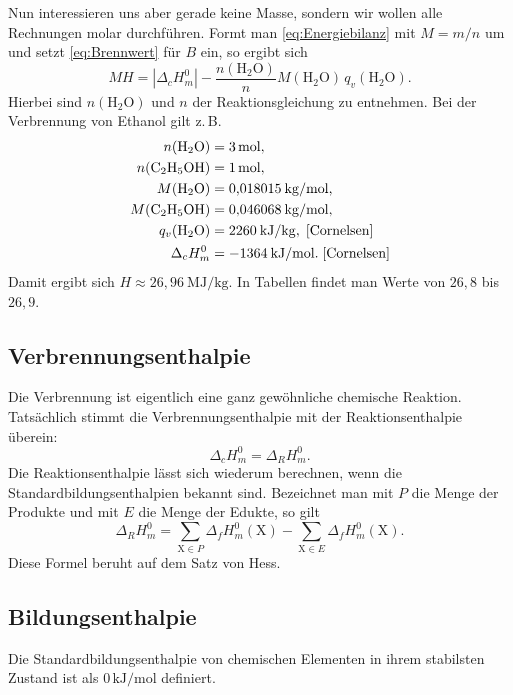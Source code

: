 \documentclass[a4paper,11pt,fleqn,twocolumn]{article}
\newcommand{\unit}[1]{\mathrm{#1}}
\begin{document}
Nun interessieren uns aber gerade keine Masse, sondern wir wollen
alle Rechnungen molar durchführen. Formt man
\eqref{eq:Energiebilanz} mit $M=m/n$ um und setzt \eqref{eq:Brennwert}
für $B$ ein, so ergibt sich
\begin{equation}
MH = |\Delta_c H_m^0| - \frac{n(\mathrm{H_2O})}{n}
M(\mathrm{H_2O})\,q_v(\mathrm{H_2O}).
\end{equation}
Hierbei sind $n(\mathrm{H_2O})$ und $n$ der Reaktionsgleichung
zu entnehmen.
Bei der Verbrennung von Ethanol gilt z.\,B.
\[\begin{split}
n(\mathrm{H_2O}) &= 3\,\unit{mol},\\
n(\mathrm{C_2H_5OH}) &= 1\,\unit{mol},\\
M(\mathrm{H_2O}) &= 0{,}018015\:\unit{kg/mol},\\
M(\mathrm{C_2H_5OH}) &= 0{,}046068\:\unit{kg/mol},\\
q_v(\mathrm{H_2O}) &= 2260\:\unit{kJ/kg},\;\cite{Cornelsen}\\
\Delta_c H_m^0 &= -1364\:\unit{kJ/mol}.\;\cite{Cornelsen}
\end{split}
\]
Damit ergibt sich $H\approx 26{,}96\:\unit{MJ/kg}$.
In Tabellen findet man Werte von $26{,}8$ bis $26{,}9$.

\subsection{Verbrennungsenthalpie}
Die Verbrennung ist eigentlich eine ganz gewöhnliche
chemische Reaktion. Tatsächlich stimmt die Verbrennungsenthalpie
mit der Reaktionsenthalpie überein:
\begin{equation}
\Delta_c H_m^0 = \Delta_R H_m^0.
\end{equation}
Die Reaktionsenthalpie lässt sich wiederum berechnen, wenn die
Standardbildungsenthalpien bekannt sind. Bezeichnet man mit
$P$ die Menge der Produkte und mit $E$ die Menge der Edukte, so gilt
\begin{equation}
\Delta_R H_m^0 = \sum_{\mathrm X\in P}\Delta_f H_m^0(\mathrm X)
- \sum_{\mathrm X\in E}\Delta_f H_m^0(\mathrm X).
\end{equation}
Diese Formel beruht auf dem Satz von Hess.

\subsection{Bildungsenthalpie}
Die Standardbildungsenthalpie von chemischen Elementen
in ihrem stabilsten Zustand ist als $0\,\unit{kJ/mol}$ definiert.
\end{document}
